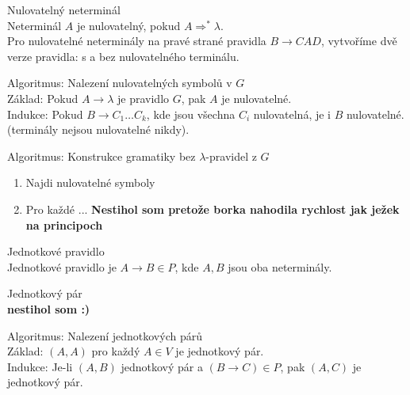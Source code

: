 \documentclass[../main.tex]{subfiles}
\begin{document}
\begin{definition}
    Nulovatelný neterminál\\

    Neterminál $A$ je nulovatelný, pokud $A \Rightarrow^* \lambda$.\\

    Pro nulovatelné neterminály na pravé strané pravidla $B \rightarrow CAD$, vytvoříme dvě verze pravidla: s a bez nulovatelného terminálu.
\end{definition}
\begin{definition}
    Algoritmus: Nalezení nulovatelných symbolů v $G$\\

    Základ: Pokud $A\rightarrow \lambda$ je pravidlo $G$, pak $A$ je nulovatelné.\\
    Indukce: Pokud $B \rightarrow C_1\dots C_k$, kde jsou všechna $C_i$ nulovatelná, je i $B$ nulovatelné. (terminály nejsou nulovatelné nikdy).
\end{definition}
\begin{definition}
    Algoritmus: Konstrukce gramatiky bez $\lambda$-pravidel z $G$\\

    \begin{enumerate}
        \item Najdi nulovatelné symboly
        \item Pro každé ... \textbf{Nestihol som pretože borka nahodila rychlost jak ježek na principoch}
    \end{enumerate}
\end{definition}
\begin{definition}
    Jednotkové pravidlo\\

    Jednotkové pravidlo je $A \rightarrow B \in P$, kde $A,B$ jsou oba neterminály.
\end{definition}

\begin{definition}
    Jednotkový pár\\

    \textbf{nestihol som :)}
\end{definition}

\begin{definition}
    Algoritmus: Nalezení jednotkových párů\\

    Základ: $(A,A)$ pro každý $A\in V$ je jednotkový pár.\\
    Indukce: Je-li $(A,B)$ jednotkový pár a $(B\rightarrow C) \in P$, pak $(A,C)$ je jednotkový pár.
\end{definition}
\end{document}
